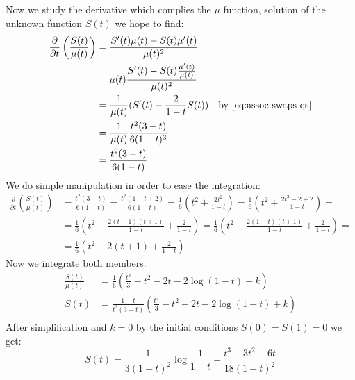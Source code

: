 Now we study the derivative which complies the $\mu$ function,
solution of the unknown function $S(t)$ we hope to find:
\begin{displaymath}
  \begin{split}
    \frac{\partial}{\partial t}\left( \frac{S(t)}{\mu (t)} \right) &=
    \frac{S^{\prime} (t)\mu (t) - S(t)\mu^{\prime} (t)}{\mu (t)^2} \\
    &= \mu (t)\frac{S^{\prime} (t) - S(t) \frac{\mu^{\prime} (t)}{\mu
        (t)} }{\mu (t)^2} \\
    &= \frac{1}{\mu (t)} (S^{\prime} (t) - \frac{2}{1-t}S(t) ) \quad
    \text{by \autoref{eq:assoc-swaps-qs}}\\
    &= \frac{1}{\mu (t)}\frac{t^2(3-t)}{6(1-t)^3} \\
    &= \frac{t^2(3-t)}{6(1-t)}
  \end{split}
\end{displaymath}
We do simple manipulation in order to ease the integration:
\begin{displaymath}
  \begin{split}
    \frac{\partial}{\partial t}\left( \frac{S(t)}{\mu (t)} \right) &=
    \frac{t^2(3-t)}{6(1-t)} = \frac{t^2(1-t + 2)}{6(1-t)} =
    \frac{1}{6}\left(t^2 + \frac{2t^2}{1-t} \right) =
    \frac{1}{6}\left(t^2 + \frac{2t^2-2+2}{1-t} \right) =\\
    &= \frac{1}{6}\left(t^2 + \frac{2(t-1)(t+1)}{1-t} +
      \frac{2}{1-t}\right) = \frac{1}{6}\left(t^2 -
      \frac{2(1-t)(t+1)}{1-t} + \frac{2}{1-t}\right) =\\
    &=
    \frac{1}{6}\left(t^2 - 2(t+1) + \frac{2}{1-t}\right)
  \end{split}
\end{displaymath}
Now we integrate both members:
\begin{displaymath}
  \begin{split}
    \frac{S(t)}{\mu (t)} &= \frac{1}{6}\left( \frac{t^3}{3} - t^2 -2t
      -2\log{(1-t)} + k\right)\\
    S(t) &= \frac{1-t}{t^2(3-t)}\left( \frac{t^3}{3} -
      t^2 -2t
      -2\log{(1-t)} + k\right)\\
  \end{split}
\end{displaymath}
After simplification and $k=0$ by the initial conditions $S(0)=S(1)=0$
we get:
\begin{equation}
  S(t) =  \frac{1}{3 (1-t)^2} \log{  \frac{1}{1-t} } +  \frac{t^3
    -3t^2 -6t}{18 (1-t)^2} 
\end{equation}

